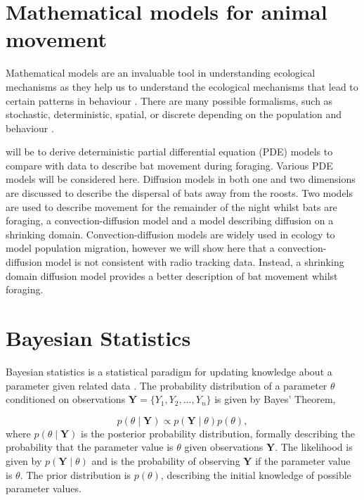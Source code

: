 \section{Mathematical models for animal movement}

  Mathematical models are an
 invaluable tool in understanding
ecological
  mechanisms as they help us to
 understand the ecological mechanisms
that lead to certain patterns in behaviour
 \cite{Ovaskainen2016}. There are
many possible formalisms, such as stochastic,
 deterministic, spatial, or
discrete depending on the population and behaviour
 \cite{Murray2011}.

  will be to derive deterministic
 partial differential equation
(PDE) models to compare with data to describe
  bat movement during foraging. Various PDE models will be considered here. Diffusion models in both one and two dimensions are discussed to describe the dispersal of bats away from the roosts. Two models are used to describe movement for the remainder of the night whilst bats are foraging, a convection-diffusion model and a model describing diffusion on a shrinking domain. Convection-diffusion models are widely used in ecology to model population migration, however we will show here that a convection-diffusion model is not consistent with radio tracking data. Instead, a shrinking domain diffusion model provides a better description of bat movement whilst foraging.

 \section{Bayesian Statistics}
 Bayesian
statistics is a statistical
paradigm for updating knowledge about a
 parameter
given related data
\cite{Gelman2013}. The probability distribution of a
parameter
 $\theta$
conditioned on observations $\bm{Y} = \{ Y_1, Y_2, ..., Y_n
\}$ is
 given by
Bayes' Theorem,

 \begin{equation}
   p(\theta \mid \bm{Y})
\propto
p(\bm{Y} \mid \theta) p(\theta)
   \nonumber,
 \end{equation}
 where
$p(\theta \mid \bm{Y})$ is the posterior probability distribution, formally
describing the probability that the parameter value is $\theta$ given
observations $\bm{Y}$. The likelihood is given by $p(\bm{Y} \mid \theta)$ and
is the probability of observing $\bm{Y}$ if the parameter value is $\theta$.
The
 prior distribution is $p(\theta)$, describing the initial knowledge of
possible
 parameter values.

